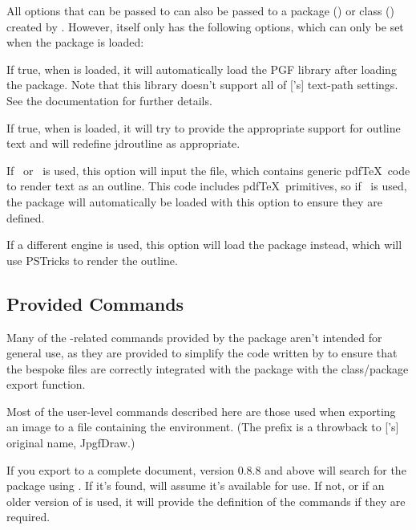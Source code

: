 \documentclass[fontsize=12pt]{scrbook}
\begin{document}
All options that can be passed to  can also be passed
to a package () or class () created by . However,
 itself only has the following options, which
can only be set when the package is loaded:


If true, when  is loaded, it will automatically
load the  PGF library after loading the 
package. Note that this library doesn't support all of
['s] text-path settings. See the 
documentation for further details.


If true, when  is loaded, it will try to
provide the appropriate support for outline text and will redefine
\gls{jdroutline} as appropriate.

If \pdfLaTeX\ or \LuaLaTeX\ is used, this option will input the
 file, which contains generic pdf\TeX\ code to
render text as an outline. This code includes pdf\TeX\ primitives,
so if \LuaLaTeX\ is used, the  package will
automatically be loaded with this option to ensure they are defined.

If a different engine is used, this option will load the
 package instead, which will use PSTricks to render
the outline.

\subsection{Provided Commands}\label{sec:flowframtkutilscmds}

Many of the -related commands provided by the
 package aren't intended for general use, as
they are provided to simplify the code written by 
to ensure that the bespoke files are correctly integrated with the
 package with the class\slash package export function. 

Most of the user-level commands described here are those used when
exporting an image to a file containing the 
environment. (The  prefix is a throwback to
['s] original name, JpgfDraw.)

If you export to a complete document,  version 0.8.8
and above will search for the  package using
. If it's found,  will assume it's
available for use. If not, or if an older version of
 is used, it will provide the definition of the
 commands if they are required.
\end{document}
